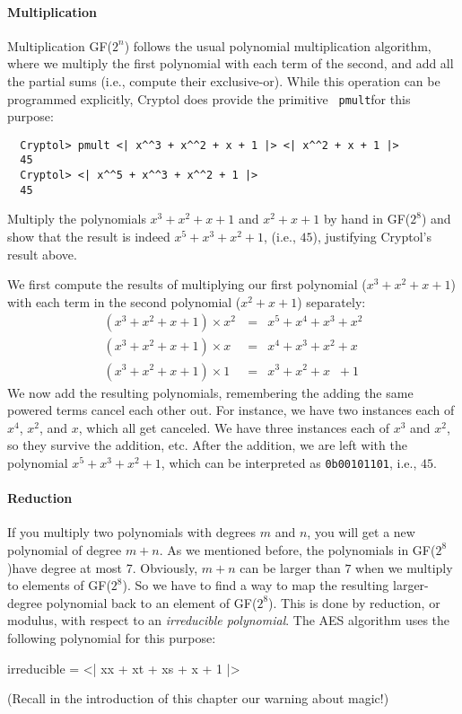 \paragraph*{Multiplication} Multiplication GF($2^n$) follows the usual
polynomial multiplication algorithm, where we multiply the first
polynomial with each term of the second, and add all the partial sums
(i.e., compute their exclusive-or). While this operation can be
programmed explicitly, Cryptol does provide the primitive {\tt
  pmult}\indMulPoly for this purpose:
\begin{Verbatim}
  Cryptol> pmult <| x^^3 + x^^2 + x + 1 |> <| x^^2 + x + 1 |>
  45
  Cryptol> <| x^^5 + x^^3 + x^^2 + 1 |>
  45
\end{Verbatim}

\begin{Exercise}\label{ex:gf:1}
  Multiply the polynomials $x^3 +x^2+x+1$ and $x^2+x+1$ by hand in
  GF($2^8$) and show that the result is indeed $x^5+x^3+x^2+1$, (i.e.,
  $45$), justifying Cryptol's result above.
\end{Exercise}
\begin{Answer}
    We first compute the results of multiplying our first
  polynomial ($x^3 +x^2+x+1$) with each term in the second polynomial
  ($x^2+x+1$) separately:
\begin{eqnarray*}
(x^3 + x^2 + x + 1) \times x^2   &=& x^5 + x^4 + x^3 + x^2 \\
(x^3 + x^2 + x + 1) \times x\;\; &=& x^4 + x^3 + x^2 + x \\
(x^3 + x^2 + x + 1) \times 1\;\; &=& x^3 + x^2 + x\;\; + 1
\end{eqnarray*}
We now add the resulting polynomials, remembering the adding the same
powered terms cancel each other out. For instance, we have two
instances each of $x^4$, $x^2$, and $x$, which all get canceled. We
have three instances each of $x^3$ and $x^2$, so they survive the
addition, etc.  After the addition, we are left with the polynomial
$x^5 + x^3 + x^2 + 1$, which can be interpreted as {\tt 0b00101101},
i.e., $45$.
\end{Answer}

\paragraph*{Reduction} If you multiply two polynomials with degrees $m$
and $n$, you will get a new polynomial of degree $m+n$. As we
mentioned before, the polynomials in GF($2^8$)\indGF have degree at
most 7. Obviously, $m+n$ can be larger than $7$ when we multiply to
elements of GF($2^8$).  So we have to find a way to map the resulting
larger-degree polynomial back to an element of GF($2^8$). This is done
by reduction, or modulus, with respect to an {\em irreducible
  polynomial}\indIrredPoly. The AES algorithm uses the following
polynomial for this purpose:
\begin{code}
  irreducible = <| x^^8 + x^^4 + x^^3 + x + 1 |>
\end{code}
(Recall in the introduction of this chapter our warning about magic!)

